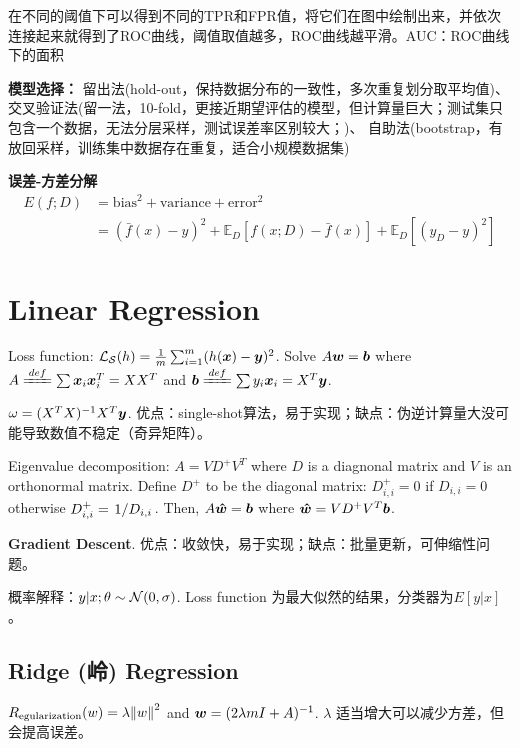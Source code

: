 \documentclass[a4paper,landscape]{article}
\begin{document}
\begin{tiny}
\begin{multicols}{4}
		在不同的阈值下可以得到不同的TPR和FPR值，将它们在图中绘制出来，并依次连接起来就得到了ROC曲线，阈值取值越多，ROC曲线越平滑。AUC：ROC曲线下的面积


		\textbf{模型选择：}
		留出法(hold-out，保持数据分布的一致性，多次重复划分取平均值)、
		交叉验证法(留一法，10-fold，更接近期望评估的模型，但计算量巨大；测试集只包含一个数据，无法分层采样，测试误差率区别较大；)、
		自助法(bootstrap，有放回采样，训练集中数据存在重复，适合小规模数据集)

		\textbf{误差-方差分解}
		\[
			\begin{aligned}
				E(f;D) & =\mathrm{bias}^2+\mathrm{variance}+\mathrm{error}^2
				\\&=(\bar{f}(x)-y)^2+\mathbb{E}_D[f(x; D)-\bar{f}(x)]+\mathbb{E}_D[(y_D-y)^2]
			\end{aligned}
		\]
		\section{Linear Regression}

		Loss function: $\mathcal{L}_{\mathcal{S}}(h)=\frac{1}{m}\sum_{i=1}^m(h(\boldsymbol{x})-\boldsymbol{y})^2$.
		Solve $A\boldsymbol{w}=\boldsymbol{b}$ where $A\deq\sum\*x_i\*x_i^T=XX^T$ and $\*b\deq\sum y_i\*x_i=X^T\*y$.

		\begin{thm}
			$\omega=(X^TX)^{-1}X^T\boldsymbol{y}$. 优点：single-shot算法，易于实现；缺点：伪逆计算量大没可能导致数值不稳定（奇异矩阵）。
		\end{thm}

		\begin{thm}
			\label{non-inv}
			Eigenvalue decomposition:
			$A=VD^+V^T$ where $D$ is a diagnonal matrix and  $V$ is an orthonormal matrix.
			Define $D^+$ to be the diagonal matrix: $D^+_{i,i}=0$ if  $D_{i,i}=0$ otherwise  $D^+_{i,i}=\flatfrac{1}{D_{i,i}}$.
			Then, $A\boldsymbol{\hat{w}}=\boldsymbol{b}$ where $\boldsymbol{\hat{w}}=VD^+V^T\boldsymbol{b}$.
		\end{thm}

		\begin{remark}
			\textbf{Gradient Descent}. 优点：收敛快，易于实现；缺点：批量更新，可伸缩性问题。
		\end{remark}
		概率解释：$y|x;\theta\sim\mathcal{N}(0,\sigma)$. Loss function 为最大似然的结果，分类器为$E[y|x]$。

		\subsection{Ridge (岭) Regression}

		$R_{\mathrm{egularization}}(w)=\lambda\norm{w}^2$ and $\boldsymbol{w}=(2\lambda mI+ A)^{-1}$.
		$\lambda$ 适当增大可以减少方差，但会提高误差。


\end{multicols}
\end{tiny}
\end{document}
